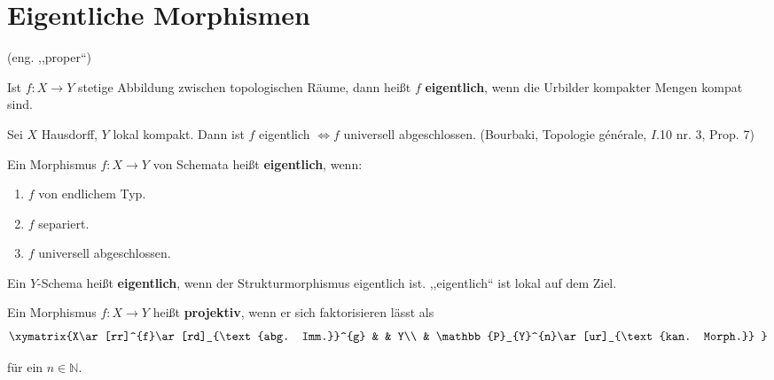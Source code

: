 \section{Eigentliche Morphismen}

(eng. ,,proper``)\medskip{}

Ist $f:X\rightarrow Y$ stetige Abbildung zwischen topologischen Räume,
dann heißt $f$ \textbf{eigentlich}, wenn die Urbilder kompakter Mengen
kompat sind.

Sei $X$ Hausdorff, $Y$ lokal kompakt. Dann ist $f$ eigentlich $\Longleftrightarrow f$
universell abgeschlossen. (Bourbaki, Topologie générale, $I$.10 nr.
3, Prop. 7)
\begin{defn}[39]
  Ein Morphismus $f:X\rightarrow Y$ von Schemata heißt \textbf{eigentlich},
  wenn:
  \begin{enumerate}
  \item $f$ von endlichem Typ.
  \item $f$ separiert.
  \item $f$ universell abgeschlossen.
  \end{enumerate}
  Ein $Y$-Schema heißt \textbf{eigentlich}, wenn der Strukturmorphismus
  eigentlich ist. ,,eigentlich`` ist lokal auf dem Ziel.\medskip{}
\end{defn}

\noindent{}
\begin{defn}[40]
  Ein Morphismus $f:X\rightarrow Y$ heißt \textbf{projektiv}, wenn
  er sich faktorisieren lässt als
  \[
    \xymatrix{X\ar[rr]^{f}\ar[rd]_{\text{abg. Imm.}}^{g} &  & Y\\
      & \mathbb{P}_{Y}^{n}\ar[ur]_{\text{kan. Morph.}}
    }
  \]

  für ein $n\in\mathbb{N}$.
\end{defn}

